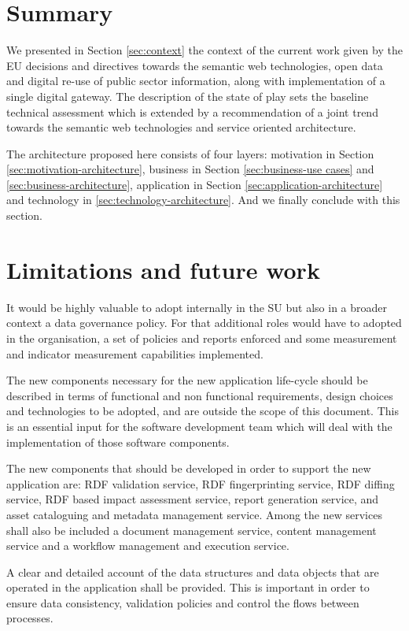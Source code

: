 	\section{Summary}
	We presented in Section \ref{sec:context} the context of the current work given by the EU decisions and directives towards the semantic web technologies, open data and digital re-use of public sector information, along with implementation of a single digital gateway. The description of the state of play sets the baseline technical assessment which is extended by a recommendation of a joint trend towards the semantic web technologies and service oriented architecture.
	
	The architecture proposed here consists of four layers: motivation in Section \ref{sec:motivation-architecture}, business in Section \ref{sec:business-use cases} and \ref{sec:business-architecture}, application in Section \ref{sec:application-architecture} and technology in \ref{sec:technology-architecture}. And we finally conclude with this section.
	
	\section{Limitations and future work}
	
	It would be highly valuable to adopt internally in the SU but also in a broader context a data governance policy. For that additional roles would have to adopted in the organisation, a set of policies and reports enforced and some measurement and indicator measurement capabilities implemented. 
	
	The new components necessary for the new application life-cycle should be described in terms of functional and non functional requirements, design choices and technologies to be adopted, and are outside the scope of this document. This is an essential input for the software development team which will deal with the implementation of those software components. 
	
	The new components that should be developed in order to support the new application are: RDF validation service, RDF fingerprinting service, RDF diffing service, RDF based impact assessment service, report generation service, and asset cataloguing and metadata management service. Among the new services shall also be included a document management service, content management service and a workflow management and execution service. 
	
	A clear and detailed account of the data structures and data objects that are operated in the application shall be provided. This is important in order to ensure data consistency, validation policies and control the flows between processes. 
	
